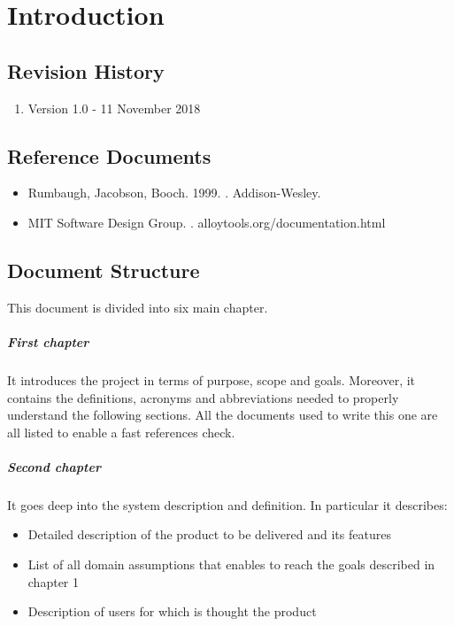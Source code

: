 \documentclass[../rasd.tex]{subfiles}
\begin{document}
\chapter{Introduction}
\thispagestyle{fancy}
		
		
		
		
		
	
		\section{Revision History}
		\begin{enumerate}
			\item Version 1.0 - 11 November 2018
		\end{enumerate}
		\section{Reference Documents}
			\begin{itemize}
				\item Rumbaugh, Jacobson, Booch. 1999. . Addison-Wesley.
				\item MIT Software Design Group. . alloytools.org/documentation.html
			\end{itemize}
		\section{Document Structure}
		This document is divided into six main chapter.
		\paragraph{First chapter}
		It introduces the project in terms of purpose, scope and goals. Moreover, it contains the definitions, acronyms and abbreviations needed to properly understand the following sections. All the documents used to write this one are all listed to enable a fast references check.
		\paragraph{Second chapter}
		It goes deep into the system description and definition. In particular it describes:
		\begin{itemize}
			\item Detailed description of the product to be delivered and its features
			\item List of all domain assumptions that enables to reach the goals described in chapter 1
			\item Description of users for which is thought the product
		\end{itemize}
\end{document}
